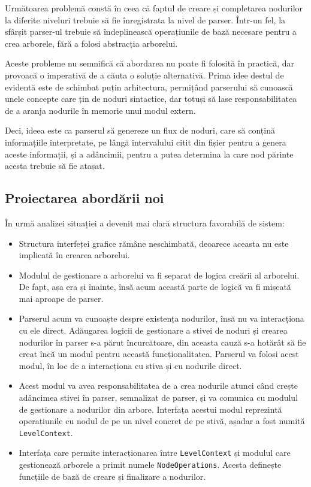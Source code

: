 \documentclass[a4paper,12pt]{report}
\begin{document}
Următoarea problemă constă în ceea că faptul de creare
și completarea nodurilor la diferite niveluri trebuie să fie înregistrata la nivel de parser.
Într-un fel, la sfârșit parser-ul trebuie să îndeplinească operațiunile
de bază necesare pentru a crea arborele, fără a folosi abstracția arborelui.

Aceste probleme nu semnifică că abordarea nu poate fi folosită în practică,
dar provoacă o imperativă de a căuta o soluție alternativă.
Prima idee destul de evidentă este de schimbat puțin arhitectura,
permițând parserului să cunoască unele concepte care țin de noduri sintactice,
dar totuși să lase responsabilitatea de a aranja nodurile în memorie unui modul extern.

Deci, ideea este ca parserul să genereze un flux de noduri,
care să conțină informațiile interpretate,
pe lângă intervalului citit din fișier pentru a genera aceste informații,
și a adâncimii, pentru a putea determina la care nod părinte acesta trebuie să fie atașat.

\subsection{Proiectarea abordării noi}

În urmă analizei situației a devenit mai clară structura favorabilă de sistem:
\begin{itemize}
    \item 
        Structura interfeței grafice rămâne neschimbată, 
        deoarece aceasta nu este implicată în crearea arborelui.

    \item
        Modulul de gestionare a arborelui va fi separat de logica creării al arborelui.
        De fapt, așa era și înainte, însă acum această parte de logică va fi mișcată mai aproape de parser.
        
    \item
        Parserul acum va cunoaște despre existența nodurilor, însă nu va interacționa cu ele direct.
        Adăugarea logicii de gestionare a stivei de noduri și crearea nodurilor în parser s-a părut încurcătoare,
        din aceasta cauză s-a hotărât să fie creat încă un modul pentru această funcționalitatea.
        Parserul va folosi acest modul, în loc de a interacționa cu stiva și cu nodurile direct.

    \item
        Acest modul va avea responsabilitatea de a crea nodurile atunci când crește adâncimea stivei în parser,
        semnalizat de parser, și va comunica cu modulul de gestionare a nodurilor din arbore.
        Interfața acestui modul reprezintă operațiunile cu nodul de pe un nivel concret de pe stivă, 
        așadar a fost numită \texttt{LevelContext}.

    \item
        Interfața care permite interacționarea între \texttt{LevelContext}
        și modulul care gestionează arborele a primit numele \texttt{NodeOperations}.
        Acesta definește funcțiile de bază de creare și finalizare a nodurilor.
\end{itemize}
\end{document}
